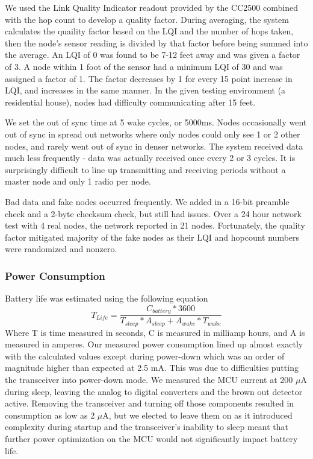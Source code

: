 We used the Link Quality Indicator readout provided by the CC2500 combined with the hop count to develop a quality factor. During averaging, the system calculates the quaility factor based on the LQI and the number of hops taken, then the node's sensor reading is divided by that factor before being summed into the average. An LQI of 0 was found to be 7-12 feet away and was given a factor of 3. A node within 1 foot of the sensor had a minimum LQI of 30 and was assigned a factor of 1. The factor decreases by 1 for every 15 point increase in LQI, and increases in the same manner. In the given testing environment (a residential house), nodes had difficulty communicating after 15 feet.

We set the out of sync time at 5 wake cycles, or 5000ms. Nodes occasionally went out of sync in spread out networks where only nodes could only see 1 or 2 other nodes, and rarely went out of sync in denser networks. The system received data much less frequently - data was actually received once every 2 or 3 cycles. It is surprisingly difficult to line up transmitting and receiving periods without a master node and only 1 radio per node.

Bad data and fake nodes occurred frequently. We added in a 16-bit preamble check and a 2-byte checksum check, but still had issues. Over a 24 hour network test with 4 real nodes, the network reported in 21 nodes. Fortunately, the quality factor mitigated majority of the fake nodes as their LQI and hopcount numbers were randomized and nonzero.

\subsubsection{Power Consumption}
Battery life was estimated using the following equation
\[T_{Life}=\frac{C_{battery} * 3600}{T_{sleep}*A_{sleep} + A_{wake}*T_{wake}}\] Where T is time measured in seconds, C is measured in milliamp hours, and A is measured in amperes.
Our measured power consumption lined up almost exactly with the calculated values except during power-down which was an order of magnitude higher than expected at 2.5 mA. This was due to difficulties putting the transceiver into power-down mode. We measured the MCU current at 200 $\mu$A during sleep, leaving the analog to digital converters and the brown out detector active. Removing the transceiver and turning off those components resulted in consumption as low as 2 $\mu$A, but we elected to leave them on as it introduced complexity during startup and the transceiver's inability to sleep meant that further power optimization on the MCU would not significantly impact battery life.

